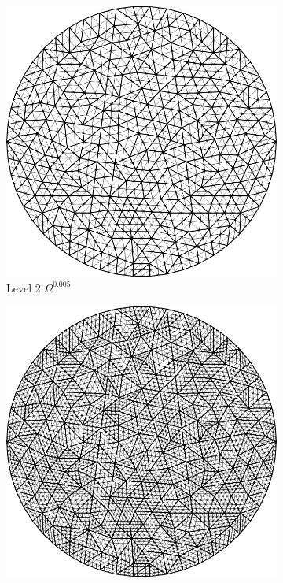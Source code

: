 \begin{figure}[t]
\begin{subfigure}[t]{.23\linewidth}
  \includegraphics[width=1\textwidth]{./Images/M1.png}
   \caption{Level 2 $\Omega^{0.005}$}
 \end{subfigure}\hfill
  \begin{subfigure}[t]{.23\linewidth}
  \includegraphics[width=1\textwidth]{./Images/M2.png}

\end{subfigure}
\end{figure}
